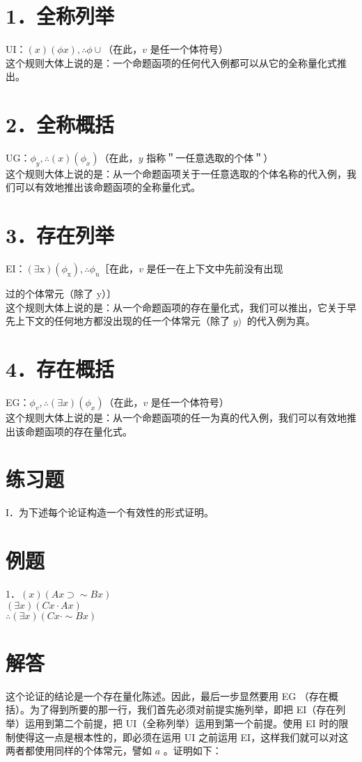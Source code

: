 \section*{1．全称列举}
UI：$(x)(\phi x), \therefore \phi \cup$（在此，$v$ 是任一个体符号）\\
这个规则大体上说的是：一个命题函项的任何代入例都可以从它的全称量化式推出。

\section*{2．全称概括}
UG：$\phi_{y}, \therefore(x)\left(\phi_{x}\right)$（在此，$y$ 指称＂一任意选取的个体＂）\\
这个规则大体上说的是：从一个命题函项关于一任意选取的个体名称的代入例，我们可以有效地推出该命题函项的全称量化式。

\section*{3．存在列举}
EI：$(\exists \mathrm{x})\left(\phi_{\mathrm{x}}\right), \therefore \phi_{\mathrm{u}}$［在此，$v$ 是任一在上下文中先前没有出现

过的个体常元（除了 y）〕\\
这个规则大体上说的是：从一个命题函项的存在量化式，我们可以推出，它关于早先上下文的任何地方都没出现的任一个体常元（除了 $y) ~$ 的代入例为真。

\section*{4．存在概括}
EG：$\phi_{v}, \therefore(\exists x)\left(\phi_{x}\right)$（在此，$v$ 是任一个体符号）\\
这个规则大体上说的是：从一个命题函项的任一为真的代入例，我们可以有效地推出该命题函项的存在量化式。

\section*{练习题}
I．为下述每个论证构造一个有效性的形式证明。

\section*{例题}
1．$(x)(A x \supset \sim B x)$\\
$(\exists x)(C x \cdot A x)$\\
$\therefore(\exists x)(C x \cdot \sim B x)$

\section*{解答}
这个论证的结论是一个存在量化陈述。因此，最后一步显然要用 EG （存在概括）。为了得到所要的那一行，我们首先必须对前提实施列举，即把 EI（存在列举）运用到第二个前提，把 UI（全称列举）运用到第一个前提。使用 EI 时的限制使得这一点是根本性的，即必须在运用 UI 之前运用 EI，这样我们就可以对这两者都使用同样的个体常元，譬如 $a$ 。证明如下：

